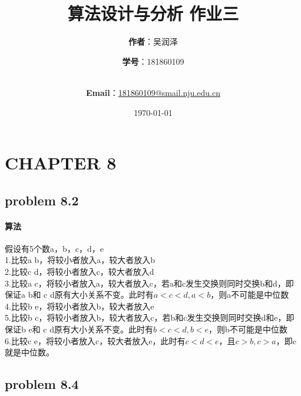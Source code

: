 \documentclass[11pt]{ctexart}
\title{\Huge\textbf{算法设计与分析 作业三}\\}
\author{\Large\textbf{作者}：吴润泽 \and{\Large\textbf{学号}：181860109}\\
	\\
	\and {\Large\textbf{Email}：\href{mailto:181860109@smail.nju.edu.cn}{181860109@smail.nju.edu.cn}}\\}
\date{\Large\today}
\begin{document}
	\maketitle
	\tableofcontents
	\newpage
	\section*{CHAPTER 8}
	\hypertarget{problem 8.2}{\subsection*{problem 8.2}}
	\paragraph{算法}
	假设有5个数a，b，c，d，e\\
	1.比较a b，将较小者放入a，较大者放入b\\
	2.比较c d，将较小者放入c，较大者放入d\\
	3.比较a c，将较小者放入a，较大者放入c，若a和c发生交换则同时交换b和d，即保证a b和
	c d原有大小关系不变。此时有$a<c<d,a<b$，则a不可能是中位数\\
	4.比较b e，将较小者放入b，较大者放入e\\
	5.比较b c，将较小者放入b，较大者放入c，若b和c发生交换则同时交换d和e，即保证b e和
	c d原有大小关系不变。此时有$b<c<d,b<e$，则b不可能是中位数\\
	6.比较c e，\hspace{5pt}将较小者放入c，较大者放入e，此时有$c<d<e$，且$c>b,c>a$，即c就是中位数。
	\newpage
	\hypertarget{problem 8.4}{\subsection*{problem 8.4}}
\end{document}
